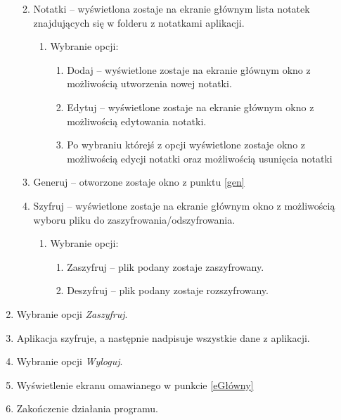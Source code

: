 \documentclass[a4paper]{article}
\begin{document}
\begin{enumerate}
\begin{enumerate}
\begin{enumerate}
\begin{enumerate}
            \end{enumerate}
        \end{enumerate}
        \item Notatki -- wyświetlona zostaje na ekranie głównym lista notatek znajdujących się w folderu z notatkami aplikacji.
        \begin{enumerate}
            \item Wybranie opcji:
            \begin{enumerate}
                \item Dodaj -- wyświetlone zostaje na ekranie głównym okno z możliwością utworzenia nowej notatki.
                \item Edytuj -- wyświetlone zostaje na ekranie głównym okno z możliwością edytowania notatki.
                \item Po wybraniu którejś z opcji wyświetlone zostaje okno z możliwością edycji notatki oraz możliwością usunięcia notatki
            \end{enumerate}
        \end{enumerate}
        \item Generuj -- otworzone zostaje okno z punktu \ref{gen}
        \item Szyfruj -- wyświetlone zostaje na ekranie głównym okno z możliwością wyboru pliku do zaszyfrowania/odszyfrowania.
        \begin{enumerate}
            \item Wybranie opcji:
            \begin{enumerate}
                \item Zaszyfruj -- plik podany zostaje zaszyfrowany.
                \item Deszyfruj -- plik podany zostaje rozszyfrowany.
            \end{enumerate}
        \end{enumerate}
    \end{enumerate}
    \item Wybranie opcji \textit{Zaszyfruj}.
    \item Aplikacja szyfruje, a następnie nadpisuje wszystkie dane z aplikacji.
    \item Wybranie opcji \textit{Wyloguj}.
    \item Wyświetlenie ekranu omawianego w punkcie \ref{eGłówny}
    \item Zakończenie działania programu.
\end{enumerate}

\newpage
\end{document}
